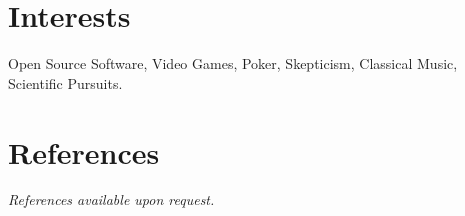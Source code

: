 \documentclass[margin,line]{resume}
\begin{document}
\begin{resume}
	\section{\mysidestyle Interests} 
	Open Source Software, Video Games, Poker, Skepticism, Classical Music, Scientific Pursuits.

	\section{\mysidestyle References}
	{\sl References available upon request.}
\end{resume}
\end{document}

